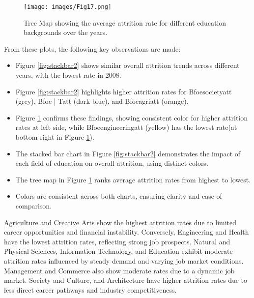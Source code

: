 \documentclass[conference]{IEEEtran}
\begin{document}
\begin{figure}[H]
    \centering
    \texttt{[image: images/Fig17.png]}
    \caption{Tree Map showing the average attrition rate for different education backgrounds over the years.}
    \label{fig:treemap1}
\end{figure}

From these plots, the following key observations are made:
\begin{itemize} 
    \item Figure \ref{fig:stackbar2} shows similar overall attrition trends across different years, with the lowest rate in 2008.
    \item Figure \ref{fig:stackbar2} highlights higher attrition rates for Bfoesocietyatt (grey), Bfoe | Tatt (dark blue), and Bfoeagriatt (orange).
    \item Figure \ref{fig:treemap1} confirms these findings, showing consistent color for higher attrition rates at left side, while Bfoeengineeringatt (yellow) has the lowest rate(at bottom right in Figure \ref{fig:treemap1}).
    \item The stacked bar chart in Figure \ref{fig:stackbar2} demonstrates the impact of each field of education on overall attrition, using distinct colors.
    \item The tree map in Figure \ref{fig:treemap1} ranks average attrition rates from highest to lowest.
    \item Colors are consistent across both charts, ensuring clarity and ease of comparison.
\end{itemize}

\par Agriculture and Creative Arts show the highest attrition rates due to limited career opportunities and financial instability. Conversely, Engineering and Health have the lowest attrition rates, reflecting strong job prospects. Natural and Physical Sciences, Information Technology, and Education exhibit moderate attrition rates influenced by steady demand and varying job market conditions. Management and Commerce also show moderate rates due to a dynamic job market. Society and Culture, and Architecture have higher attrition rates due to less direct career pathways and industry competitiveness.
\end{document}
